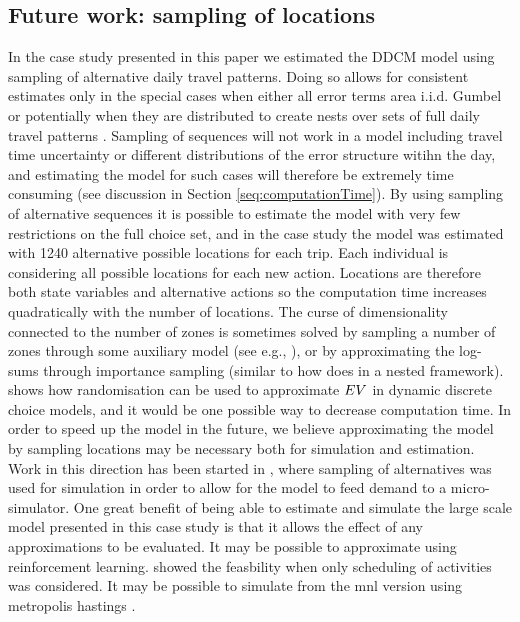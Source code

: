  \subsection{Future work: sampling of locations}
In the case study presented in this paper we estimated the DDCM model using sampling of alternative daily travel patterns. Doing so allows for consistent estimates only in the special cases when either all error terms area i.i.d. Gumbel or potentially when they are distributed to create nests over sets of full daily travel patterns \citep[using][]{guevara2013MEV}. Sampling of sequences will not work in a model including travel time uncertainty or different distributions of the error structure witihn the day, and estimating the model for such cases will therefore be extremely time consuming (see discussion in Section \ref{seq:computationTime}). By using sampling of alternative sequences it is possible to estimate the model with very few restrictions on the full choice set, and in the case study the model was estimated with 1240 alternative possible locations for each trip. Each individual is considering all possible locations for each new action. Locations are therefore both state variables and alternative actions so the computation time increases quadratically with the number of locations. The curse of dimensionality connected to the number of zones is sometimes solved by sampling a number of zones through some auxiliary model (see e.g., \citep{liao2013incorporating}), or by approximating the log-sums through importance sampling (similar to how \citealt{bradley2010sacsim} does in a nested framework). \citet{Rust97} shows how randomisation can be used to approximate $EV$ in dynamic discrete choice models, and it would be one possible way to decrease computation time.
In order to speed up the model in the future, we believe approximating the model by sampling locations may be necessary both for simulation and estimation. Work in this direction has been started in \citet{saleem18largeScale}, where sampling of alternatives was used for simulation in order to allow for the model to feed demand to a micro-simulator. One great benefit of being able to estimate and simulate the large scale model presented in this case study is that it allows the effect of any approximations to be evaluated. 
It may be possible to approximate using reinforcement learning. \citep{vanhusel09} showed the feasbility when only scheduling of activities was considered. It may be possible to simulate from the mnl version using metropolis hastings \citep{danalet}.%